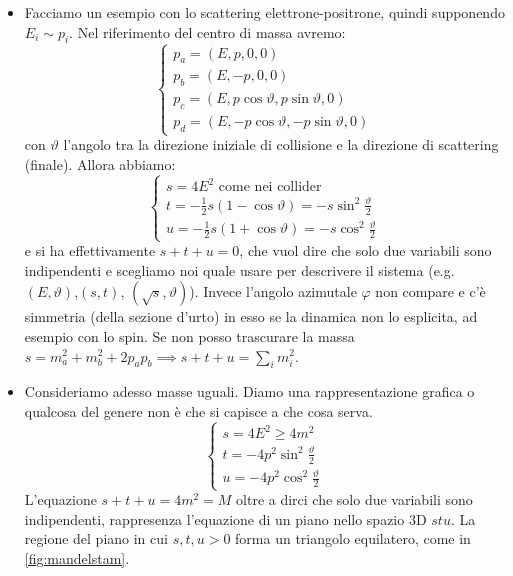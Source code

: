 \begin{itemize}
    \item Facciamo un esempio con lo scattering elettrone-positrone, quindi supponendo $E_i\sim p_i$. Nel riferimento del centro di massa avremo:
    \begin{equation*}
    \begin{cases}
        p_a=(E,p,0,0)\\
        p_b=(E,-p,0,0)\\
        p_c=(E,p\cos\vartheta,p\sin\vartheta,0)\\
        p_d=(E,-p\cos\vartheta,-p\sin\vartheta,0)
    \end{cases}
    \end{equation*}
    con $\vartheta$ l'angolo tra la direzione iniziale di collisione e la direzione di scattering (finale). Allora abbiamo:
    \begin{equation*}
        \begin{cases}
            s=4E^2\text{ come nei collider}\\
            t=-\frac12s(1-\cos\vartheta)=-s\sin^2\frac\vartheta2 \\
            u=-\frac12s(1+\cos\vartheta)=-s\cos^2\frac\vartheta2
        \end{cases}
    \end{equation*}
        e si ha effettivamente $s+t+u=0$, che vuol dire che solo due variabili sono indipendenti e scegliamo noi quale usare per descrivere il sistema (e.g. $(E,\vartheta)$,$(s,t)$, $(\sqrt s,\vartheta)$). Invece l'angolo azimutale $\varphi$ non compare e c'è simmetria (della sezione d'urto) in esso se la dinamica non lo esplicita, ad esempio con lo spin. Se non posso trascurare la massa $s=m_a^2+m_b^2+2p_ap_b\implies s+t+u=\sum_i m_i^2$.
        \item Consideriamo adesso masse uguali. Diamo una rappresentazione grafica o qualcosa del genere non è che si capisce a che cosa serva.
        \begin{equation*}
            \begin{cases}
                s=4E^2\geq 4m^2\\
                t=-4p^2\sin^2\frac\vartheta2 \\
                u=-4p^2\cos^2\frac\vartheta2
            \end{cases}
        \end{equation*}
        L'equazione $s+t+u=4m^2=M$ oltre a dirci che solo due variabili sono indipendenti, rappresenza l'equazione di un piano nello spazio 3D $stu$. La regione del piano in cui $s,t,u>0$ forma un triangolo equilatero, come in \autoref{fig:mandelstam}.

\end{itemize}
